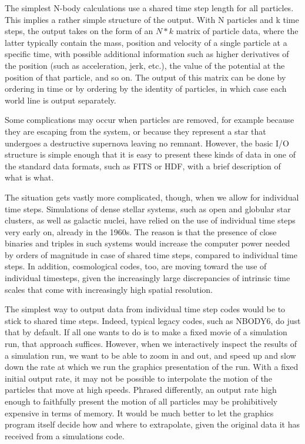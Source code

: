 \documentclass[5p,authoryear]{elsarticle}
\begin{document}
The simplest N-body calculations use a shared time step length for all
particles.  This implies a rather simple structure of the output.  With
N particles and k time steps, the output takes on the form of an $N*k$
matrix of particle data, where the latter typically contain the mass,
position and velocity of a single particle at a specific time, with
possible additional information such as higher derivatives of the position
(such as acceleration, jerk, etc.), the value of the potential at the 
position of that particle, and so on.  The output of this matrix can
be done by ordering in time or by ordering by the identity of particles,
in which case each world line is output separately.

Some complications may occur when particles are removed, for example
because they are escaping from the system, or because they represent
a star that undergoes a destructive supernova leaving no remnant.
However, the basic I/O structure is simple enough that it is easy to
present these kinds of data in one of the standard data formats, such
as FITS or HDF, with a brief description of what is what.

The situation gets vastly more complicated, though, when we allow for
individual time steps.  Simulations of dense stellar systems, such as
open and globular star clusters, as well as galactic nuclei, have
relied on the use of individual time steps very early on, already in
the 1960s.  The reason is that the presence of close binaries and
triples in such systems would increase the computer power needed by
orders of magnitude in case of shared time steps, compared to
individual time steps.  In addition, cosmological codes, too, are
moving toward the use of individual timesteps, given the increasingly
large discrepancies of intrinsic time scales that come with
increasingly high spatial resolution.

The simplest way to output data from individual time step codes would
be to stick to shared time steps.  Indeed, typical legacy codes, such
as NBODY6, do just that by default.  If all one wants to do is to make
a fixed movie of a simulation run, that approach suffices.  However,
when we interactively inspect the results of a simulation run, we want
to be able to zoom in and out, and speed up and slow down the rate at
which we run the graphics presentation of the run.  With a fixed
initial output rate, it may not be possible to interpolate the motion
of the particles that move at high speeds.  Phrased differently, an
output rate high enough to faithfully present the motion of all
particles may be prohibitively expensive in terms of memory.  It would
be much better to let the graphics program itself decide how and where
to extrapolate, given the original data it has received from a
simulations code.
\end{document}
